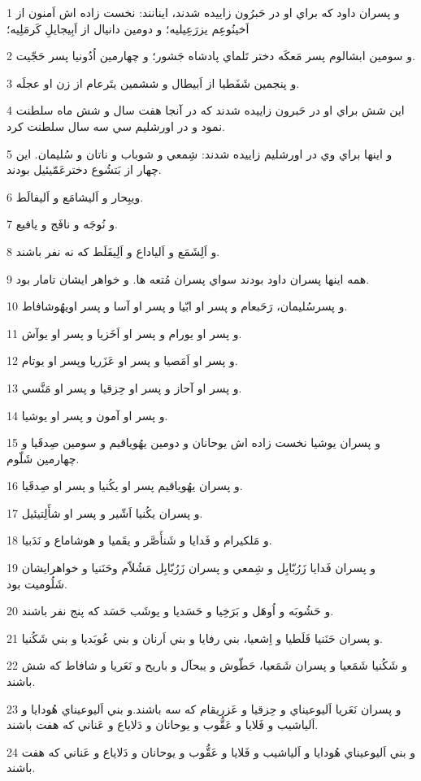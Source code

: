 \par 1 و پسران داود که براي او در حَبرُون زاييده شدند، اينانند: نخست زاده اش اَمنون از اَخينُوعِم يزرَعِيليه؛ و دومين دانيال از اَبِيجايلِ کَرمَلِيه؛
\par 2 و سومين ابشالوم پسر مَعکَه دختر تَلماي پادشاه جَشور؛ و چهارمين اُدُونيا پسر حَجّيت.
\par 3 و پنجمين شَفَطيا از اَبيطال و ششمين يتَرعام از زن او عجلَه.
\par 4 اين شش براي او در حَبرون زاييده شدند که در آنجا هفت سال و شش ماه سلطنت نمود و در اورشليم سي سه سال سلطنت کرد.
\par 5 و اينها براي وي در اورشليم زاييده شدند: شِمعي و شوباب و ناتان و سُليمان. اين چهار از بَتشُوع دخترعَمّيئيل بودند.
\par 6 ويبِحار و اَليشامَع و اَليفالَط.
\par 7 و نُوجَه و نافَج و يافيع.
\par 8 و اَلِشَمَع و اَلياداع و اَلِيفَلَط که نه نفر باشند.
\par 9 همه اينها پسران داود بودند سواي پسران مُتعه ها. و خواهر ايشان تامار بود.
\par 10 و پسرسُليمان، رَحَبعام و پسر او ابّيا و پسر او آسا و پسر اويهُوشافاط.
\par 11 و پسر او يورام و پسر او اَخَزيا و پسر او يوآش.
\par 12 و پسر او اَمَصيا و پسر او عَزَريا وپسر او يوتام.
\par 13 و پسر او آحاز و پسر او حِزقيا و پسر او مَنَّسي.
\par 14 و پسر او آمون و پسر او يوشيا.
\par 15 و پسران يوشيا نخست زاده اش يوحانان و دومين يهُوياقيم و سومين صِدقَيا و چهارمين شَلّوم.
\par 16 و پسران يهُوياقيم پسر او يکُنيا و پسر او صِدقَيا.
\par 17 و پسران يکُنيا اَشّير و پسر او شأَلِتيئيل.
\par 18 و مَلکيرام و فَدايا و شَنأَصَّر و يقَميا و هوشاماع و نَدَبيا.
\par 19 و پسران فَدايا زَرُبّابِل و شِمعي و پسران زَرُبّابِل مَشُلاّم وحَنَنيا و خواهرايشان شَلُوميت بود.
\par 20 و حَشُوبَه و اُوهَل و بَرَخِيا و حَسَديا و يوشَب حَسَد که پنج نفر باشند.
\par 21 و پسران حَنَنيا فَلَطيا و اِشعيا، بني رفايا و بني اَرنان و بني عُوبَديا و بني شَکُنيا.
\par 22 و شَکُنيا شَمَعيا و پسران شَمَعيا، حَطّوش و يبحآل و باريح و نَعَريا و شافاط که شش باشند.
\par 23 و پسران نَعَريا اَليوعيناي و حِزقيا و عَزريقام که سه باشند.و بني اَليوعيناي هُودايا و اَلياشيب و فَلايا و عَقُّوب و يوحانان و دَلاياع و عَناني که هفت باشند. 
\par 24 و بني اَليوعيناي هُودايا و اَلياشيب و فَلايا و عَقُّوب و يوحانان و دَلاياع و عَناني که هفت باشند.
 
